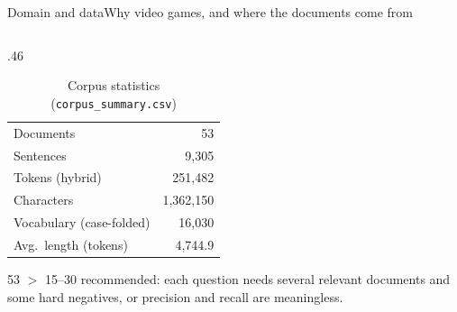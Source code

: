 \documentclass[
  aspectratio=169,
  10pt,
  t,
]{beamer}
\newcommand{\muted}[1]{\textcolor{muted}{#1}}
\begin{document}
\begin{frame}{Domain and data}{Why video games, and where the documents come from}
\begin{columns}[T]
\begin{column}{.46\textwidth}
\begin{table}
\small
\begin{tabular}{lr}
\toprule
Documents & 53 \\
Sentences & 9,305 \\
Tokens (hybrid) & 251,482 \\
Characters & 1,362,150 \\
Vocabulary (case-folded) & 16,030 \\
Avg.\ length (tokens) & 4,744.9 \\
\bottomrule
\end{tabular}
\caption{Corpus statistics (\texttt{corpus\_summary.csv})}
\end{table}
\muted{\scriptsize 53 $>$ 15--30 recommended: each question needs several relevant documents and some hard negatives, or precision and recall are meaningless.}
\end{column}
\end{columns}
\end{frame}
\end{document}
